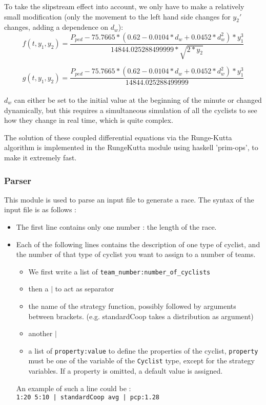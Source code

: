 \documentclass[10pt, a4paper]{report}
\begin{document}
To take the slipstream effect into account, we only have to make a relatively small modification (only the movement to the left hand side changes for $y_2'$ changes, adding a dependence on $d_w$):
$$ f(t, y_1, y_2) = \frac{P_{ped} - 75.7665 * (0.62 - 0.0104*d_w + 0.0452*d_w^2) * y_1 ^ 3}{14844.025288499999 * \sqrt{2 * y_2}}$$

$$ g( t, y_1, y_2 ) = \frac{P_{ped} - 75.7665 * (0.62 - 0.0104*d_w + 0.0452*d_w^2) * y_1 ^ 3}{14844.025288499999}$$ \\

$d_w$ can either be set to the initial value at the beginning of the minute or changed dynamically, but this requires a simultaneous simulation of all the cyclists to see how they change in real time, which is quite complex.

The solution of these coupled differential equations via the Runge-Kutta algorithm is implemented in the RungeKutta module using haskell 'prim-ops', to make it extremely fast.

\subsubsection{Parser}

This module is used to parse an input file to generate a race. The syntax of the input file is as follows :
\begin{itemize}
\item The first line contains only one number : the length of the race.

\item Each of the following lines contains the description of one type of cyclist, and the number of that type of cyclist you want to assign to a number of teams.
\begin{itemize}
\item We first write a list of \texttt{team\_number:number\_of\_cyclists}
\item then a $|$ to act as separator
\item the name of the strategy function, possibly followed by arguments between brackets. (e.g. standardCoop takes a distribution as argument)
\item another $|$
\item a list of \texttt{property:value} to define the properties of the cyclist, \texttt{property} must be one of the variable of the \texttt{Cyclist} type, except for the strategy variables. If a property is omitted, a default value is assigned.
\end{itemize}
An example of such a line could be : \\ \texttt{1:20 5:10 | standardCoop avg | pcp:1.28}
\end{itemize}
\end{document}
